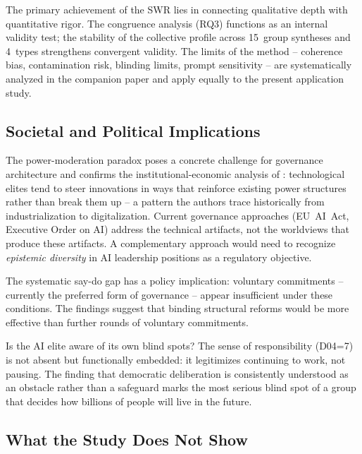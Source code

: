 \documentclass[12pt,a4paper]{article}
\begin{document}
The primary achievement of the SWR lies in connecting qualitative depth with quantitative rigor. The congruence analysis (RQ3) functions as an internal validity test; the stability of the collective profile across 15~group syntheses and 4~types strengthens convergent validity. The limits of the method -- coherence bias, contamination risk, blinding limits, prompt sensitivity -- are systematically analyzed in the companion paper \citep{Geiger2026SWR} and apply equally to the present application study.


\subsection{Societal and Political Implications}
\label{sec:diskussion:implikationen}

The power-moderation paradox poses a concrete challenge for governance architecture and confirms the institutional-economic analysis of \citet{AcemogluJohnson2023}: technological elites tend to steer innovations in ways that reinforce existing power structures rather than break them up -- a pattern the authors trace historically from industrialization to digitalization. Current governance approaches (EU~AI~Act, Executive Order on AI) address the technical artifacts, not the worldviews that produce these artifacts. A complementary approach would need to recognize \emph{epistemic diversity} in AI leadership positions as a regulatory objective.

The systematic say-do gap has a policy implication: voluntary commitments -- currently the preferred form of governance \citep[cf.][]{Bengio2024} -- appear insufficient under these conditions. The findings suggest that binding structural reforms would be more effective than further rounds of voluntary commitments.

Is the AI elite aware of its own blind spots? The sense of responsibility (D04=7) is not absent but functionally embedded: it legitimizes continuing to work, not pausing. The finding that democratic deliberation is consistently understood as an obstacle rather than a safeguard marks the most serious blind spot of a group that decides how billions of people will live in the future.


\subsection{What the Study Does Not Show}
\label{sec:diskussion:negativ}
\end{document}
